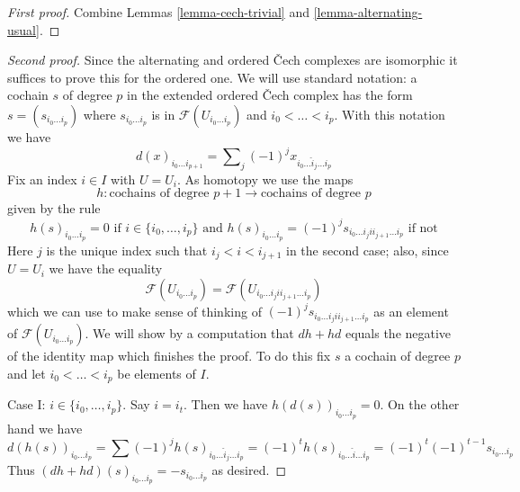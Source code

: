\begin{proof}[First proof]
Combine Lemmas \ref{lemma-cech-trivial} and \ref{lemma-alternating-usual}.
\end{proof}

\begin{proof}[Second proof]
Since the alternating and ordered {\v C}ech complexes are isomorphic
it suffices to prove this for the ordered one.
We will use standard notation: a cochain $s$ of degree $p$
in the extended ordered {\v C}ech complex has the form
$s = (s_{i_0 \ldots i_p})$ where $s_{i_0 \ldots i_p}$ is in
$\mathcal{F}(U_{i_0 \ldots i_p})$ and $i_0 < \ldots < i_p$.
With this notation we have
$$
d(x)_{i_0 \ldots i_{p + 1}} =
\sum\nolimits_j (-1)^j x_{i_0 \ldots \hat i_j \ldots i_p}
$$
Fix an index $i \in I$ with $U = U_i$.
As homotopy we use the maps
$$
h : \text{cochains of degree }p + 1 \to \text{cochains of degree }p
$$
given by the rule
$$
h(s)_{i_0 \ldots i_p} = 0 \text{ if } i \in \{i_0, \ldots, i_p\}
\text{ and }
h(s)_{i_0 \ldots i_p} = 
(-1)^j s_{i_0 \ldots i_j i i_{j + 1} \ldots i_p} \text{ if not}
$$
Here $j$ is the unique index such that $i_j < i < i_{j + 1}$ in the
second case; also, since $U = U_i$ we have the equality
$$
\mathcal{F}(U_{i_0 \ldots i_p}) =
\mathcal{F}(U_{i_0 \ldots i_j i i_{j + 1} \ldots i_p})
$$
which we can use to make sense of thinking of
$(-1)^j s_{i_0 \ldots i_j i i_{j + 1} \ldots i_p}$
as an element of $\mathcal{F}(U_{i_0 \ldots i_p})$.
We will show by a computation that $d h + h d$ equals
the negative of the identity map which finishes the proof.
To do this fix $s$ a cochain of degree $p$ and let
$i_0 < \ldots < i_p$ be elements of $I$.

\medskip\noindent
Case I: $i \in \{i_0, \ldots, i_p\}$. Say $i = i_t$. Then we have
$h(d(s))_{i_0 \ldots i_p} = 0$. On the other hand we have
$$
d(h(s))_{i_0 \ldots i_p} =
\sum (-1)^j h(s)_{i_0 \ldots \hat i_j \ldots i_p} =
(-1)^t h(s)_{i_0 \ldots \hat i \ldots i_p} =
(-1)^t (-1)^{t - 1} s_{i_0 \ldots i_p}
$$
Thus $(dh + hd)(s)_{i_0 \ldots i_p} = -s_{i_0 \ldots i_p}$ as desired.


\end{proof}
